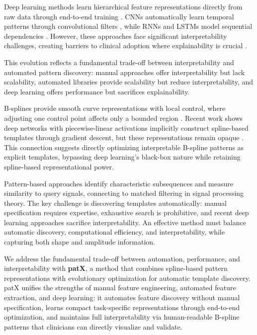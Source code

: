\documentclass[11pt]{article}
\begin{document}
Deep learning methods learn hierarchical feature representations directly from
raw data through end-to-end training \cite{miotto2018deep}.
CNNs automatically learn temporal patterns through convolutional filters
\cite{wang2022systematic}, while RNNs and LSTMs model sequential dependencies
\cite{lee2021modeling}.
However, these approaches face significant interpretability challenges, creating
barriers to clinical adoption where explainability is crucial
\cite{rudin2019stop, ennab2024enhancing}.

This evolution reflects a fundamental trade-off between interpretability and
automated pattern discovery: manual approaches offer interpretability but lack
scalability, automated libraries provide scalability but reduce interpretability,
and deep learning offers performance but sacrifices explainability.

B-splines provide smooth curve representations with local control, where
adjusting one control point affects only a bounded region
\cite{balestriero2018spline}.
Recent work shows deep networks with piecewise-linear activations implicitly
construct spline-based templates through gradient descent, but these
representations remain opaque \cite{balestriero2018spline}.
This connection suggests directly optimizing interpretable B-spline patterns as
explicit templates, bypassing deep learning's black-box nature while retaining
spline-based representational power.

Pattern-based approaches identify characteristic subsequences and measure
similarity to query signals, connecting to matched filtering in signal
processing theory.
The key challenge is discovering templates automatically: manual specification
requires expertise, exhaustive search is prohibitive, and recent deep learning
approaches sacrifice interpretability.
An effective method must balance automatic discovery, computational efficiency,
and interpretability, while capturing both shape and amplitude information.

We address the fundamental trade-off between automation, performance, and
interpretability with \textbf{patX}, a method that combines spline-based
pattern representations with evolutionary optimization for automatic template
discovery.
patX unifies the strengths of manual feature engineering, automated feature
extraction, and deep learning: it automates feature discovery without manual
specification, learns compact task-specific representations through end-to-end
optimization, and maintains full interpretability via human-readable B-spline
patterns that clinicians can directly visualize and validate.
\end{document}
